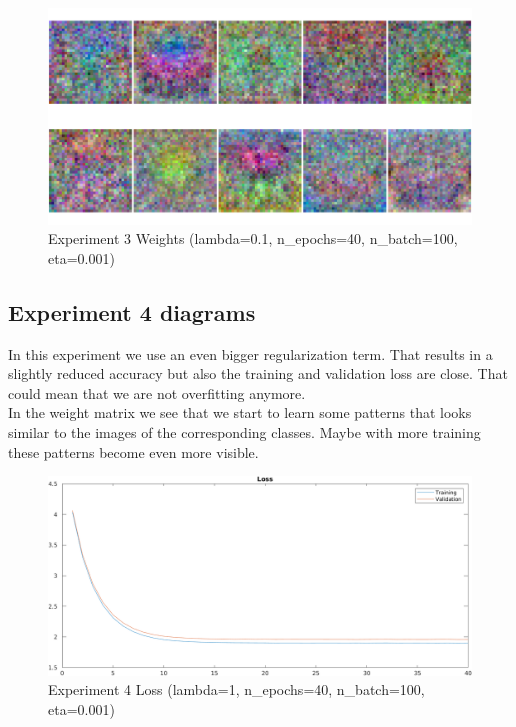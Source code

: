     \begin{figure}[ht]
        \includegraphics[width=\textwidth]{../code/result_pics/lambda=.1, n_epochs=40, n_batch=100, eta=.001/weights.png}
        \caption{Experiment 3 Weights (lambda=0.1, n\_epochs=40, n\_batch=100, eta=0.001)}
        \label{fig:weights3}
    \end{figure}

\clearpage
\subsection{Experiment 4 diagrams}
In this experiment we use an even bigger regularization term. That results in a slightly reduced accuracy but also the training 
and validation loss are close. That could mean that we are not overfitting anymore.\\
In the weight matrix we see that we start to learn some patterns that looks similar to the images of the corresponding classes. 
Maybe with more training these patterns become even more visible.

    \begin{figure}[ht]
        \includegraphics[width=\textwidth]{../code/result_pics/lambda=1, n_epochs=40, n_batch=100, eta=.001/loss.png}
        \caption{Experiment 4 Loss (lambda=1, n\_epochs=40, n\_batch=100, eta=0.001)}
        \label{fig:loss4}
    \end{figure}

